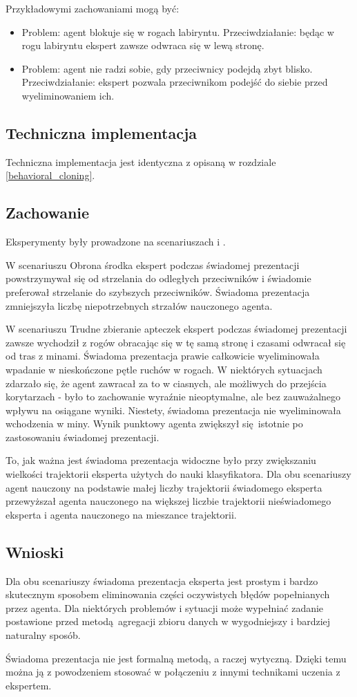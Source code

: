 \pagebreak
Przykładowymi zachowaniami mogą być:
\begin{itemize}
\item{Problem: agent blokuje się w rogach labiryntu. Przeciwdziałanie: będąc w rogu labiryntu ekspert zawsze odwraca się w lewą stronę.}
\item{Problem: agent nie radzi sobie, gdy przeciwnicy podejdą zbyt blisko. Przeciwdziałanie: ekspert pozwala przeciwnikom podejść do siebie przed wyeliminowaniem ich.}
\end{itemize}

\subsection{Techniczna implementacja}

Techniczna implementacja jest identyczna z opisaną w rozdziale \ref{behavioral_cloning}.

\subsection{Zachowanie}
Eksperymenty były prowadzone na scenariuszach  i .

W scenariuszu Obrona środka ekspert podczas świadomej prezentacji powstrzymywał się od strzelania do odległych przeciwników i świadomie preferował strzelanie do szybszych przeciwników. Świadoma prezentacja zmniejszyła liczbę niepotrzebnych strzałów nauczonego agenta.

W scenariuszu Trudne zbieranie apteczek ekspert podczas świadomej prezentacji zawsze wychodził z rogów obracając się w tę samą stronę i czasami odwracał się od tras z minami. Świadoma prezentacja prawie całkowicie wyeliminowała wpadanie w nieskończone pętle ruchów w rogach. W niektórych sytuacjach zdarzało się, że agent zawracał za to w ciasnych, ale możliwych do przejścia korytarzach - było to zachowanie wyraźnie nieoptymalne, ale bez zauważalnego wpływu na osiągane wyniki. Niestety, świadoma prezentacja nie wyeliminowała wchodzenia w miny. Wynik punktowy agenta zwiększył się istotnie po zastosowaniu świadomej prezentacji.

To, jak ważna jest świadoma prezentacja widoczne było przy zwiększaniu wielkości trajektorii eksperta użytych do nauki klasyfikatora. Dla obu scenariuszy agent nauczony na podstawie małej liczby trajektorii świadomego eksperta przewyższał agenta nauczonego na większej liczbie trajektorii nieświadomego eksperta i agenta nauczonego na mieszance trajektorii. 
 
\subsection{Wnioski}

Dla obu scenariuszy świadoma prezentacja eksperta jest prostym i bardzo skutecznym sposobem eliminowania części oczywistych błędów popełnianych przez agenta. Dla niektórych problemów i sytuacji może wypełniać zadanie postawione przed metodą agregacji zbioru danych w wygodniejszy i bardziej naturalny sposób.

Świadoma prezentacja nie jest formalną metodą, a raczej wytyczną. Dzięki temu można ją z powodzeniem stosować w połączeniu z innymi technikami uczenia z ekspertem.
